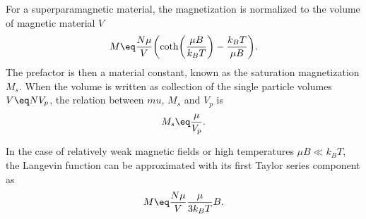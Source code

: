 \documentclass[\main/dresen_thesis.tex]{subfiles}
\begin{document}
    For a superparamagnetic material, the magnetization is normalized to the volume of magnetic material $V$
    \begin{align}
      M \eq \frac{N \mu}{V} \biggl(\coth \biggl( \frac{\mu B}{k_B T} \biggr) - \frac{k_B T}{\mu B} \biggr).
    \end{align}
    The prefactor is then a material constant, known as the saturation magnetization $M_s$.
    When the volume is written as collection of the single particle volumes $V \eq N V_p$, the relation between $mu$, $M_s$ and $V_p$ is
    \begin{align}
      M_s \eq \frac{\mu}{V_p}.
    \end{align}

    In the case of relatively weak magnetic fields or high temperatures $\mu B \ll k_B T$, the Langevin function can be approximated with its first Taylor series component as
    \begin{align}
      M \eq \frac{N \mu}{V} \frac{\mu}{3 k_B T} B.
    \end{align}
\end{document}
